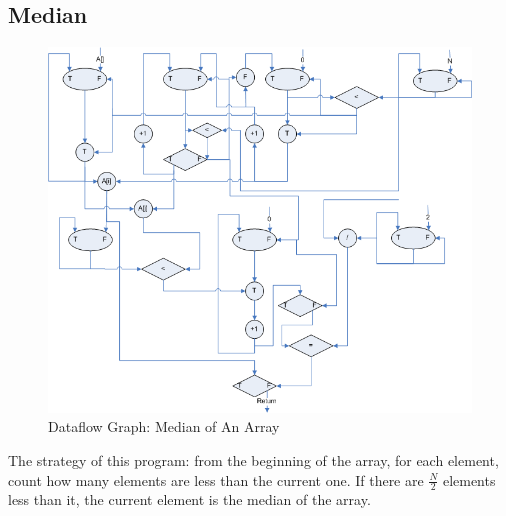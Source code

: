 \documentclass[12pt]{article}
\begin{document}
\subsection{Median}
\begin{figure}[h!]
	\begin{center}
		\includegraphics[width=1.1\textwidth, angle=0]{median.png}
		\caption{\label{fig:median}Dataflow Graph: Median of An Array}
	\end{center}
\end{figure}
The strategy of this program: from the beginning of the array, for each
element, count how many elements are less than the current one. If there 
are $\frac{N}{2}$ elements less than it, the current element is the median 
of the array.
\end{document}
